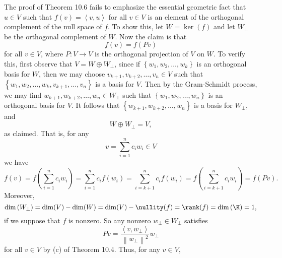\documentclass[linearalgebra]{subfiles}
\begin{document}
    \begin{remark}
        The proof of Theorem 10.6 fails to emphasize the essential geometric fact that $u\in V$ such that $f(v) = \left\langle v, u\right\rangle$ for all $v\in V$ is an element of the orthogonal complement of the null space of $f$. To show this, let $W = \ker(f)$ and let $W_\perp$ be the orthogonal complement of $W$. Now the claim is that
        \begin{equation*}
            f(v) = f\left( Pv \right)
        \end{equation*}
        for all $v\in V$, where $P:V\to V$ is the orthogonal projection of $V$ on $W$. To verify this, first observe that $V = W\oplus W_\perp$, since if $\left\lbrace w_1,w_2,\ldots,w_k \right\rbrace$ is an orthogonal basis for $W$, then we may choose $v_{k+1}, v_{k+2}, \ldots, v_n\in V$ such that $\left\lbrace w_1,w_2,\ldots,w_k, v_{k+1}, \ldots, v_n \right\rbrace$ is a basis for $V$. Then by the Gram-Schmidt process, we may find $w_{k+1}, w_{k+2}, \ldots, w_n\in W_\perp$ such that $\left\lbrace w_1,w_2,\ldots,w_n \right\rbrace$ is an orthogonal basis for $V$. It follows that $\left\lbrace w_{k+1}, w_{k+2}, \ldots, w_{n} \right\rbrace$ is a basis for $W_\perp$, and
        \begin{equation*}
            W\oplus W_\perp = V,
        \end{equation*}
        as claimed. That is, for any
        \begin{equation*}
            v = \sum^{n}_{i=1} c_iw_i\in V
        \end{equation*}
        we have
        \begin{equation*}
            f\left( v \right) = f\left( \sum^{n}_{i=1} c_iw_i \right) = \sum^{n}_{i=1} c_if\left( w_i \right) = \sum^{n}_{i=k+1} c_if\left( w_i \right) = f\left( \sum^{n}_{i=k+1} c_iw_i \right) = f\left( Pv \right).
        \end{equation*}
        Moreover, 
        \begin{equation*}
            \dim\left( W_\perp \right) = \dim(V)-\dim(W) = \dim(V)-\nullity(f) = \rank(f) = \dim\left( \K \right) = 1,
        \end{equation*}
        if we suppose that $f$ is nonzero. So any nonzero $w_\perp\in W_\perp$ satisfies 
        \begin{equation*}
            Pv = \frac{\left\langle v, w_\perp\right\rangle }{\left\lVert w_\perp\right\rVert ^2}w_\perp
        \end{equation*}
        for all $v\in V$ by (c) of Theorem 10.4. Thus, for any $v\in V$,

\end{remark}
\end{document}
